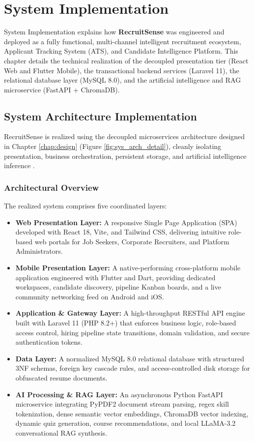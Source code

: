 \chapter{System Implementation} \label{chap:sysImplementation}

System Implementation explains how \textbf{RecruitSense} was engineered and deployed as a fully functional, multi-channel intelligent recruitment ecosystem, Applicant Tracking System (ATS), and Candidate Intelligence Platform. This chapter details the technical realization of the decoupled presentation tier (React Web and Flutter Mobile), the transactional backend services (Laravel 11), the relational database layer (MySQL 8.0), and the artificial intelligence and RAG microservice (FastAPI + ChromaDB).

\section{System Architecture Implementation}
RecruitSense is realized using the decoupled microservices architecture designed in Chapter \ref{chap:design} (Figure \ref{fig:sys_arch_detail}), cleanly isolating presentation, business orchestration, persistent storage, and artificial intelligence inference \cite{fielding2000rest, lewis2020rag, flutter2022google}.

\subsection{Architectural Overview}
The realized system comprises five coordinated layers:
\begin{itemize}
    \item \textbf{Web Presentation Layer:} A responsive Single Page Application (SPA) developed with React 18, Vite, and Tailwind CSS, delivering intuitive role-based web portals for Job Seekers, Corporate Recruiters, and Platform Administrators.
    \item \textbf{Mobile Presentation Layer:} A native-performing cross-platform mobile application engineered with Flutter and Dart, providing dedicated workspaces, candidate discovery, pipeline Kanban boards, and a live community networking feed on Android and iOS.
    \item \textbf{Application \& Gateway Layer:} A high-throughput RESTful API engine built with Laravel 11 (PHP 8.2+) that enforces business logic, role-based access control, hiring pipeline state transitions, domain validation, and secure authentication tokens.
    \item \textbf{Data Layer:} A normalized MySQL 8.0 relational database with structured 3NF schemas, foreign key cascade rules, and access-controlled disk storage for obfuscated resume documents.
    \item \textbf{AI Processing \& RAG Layer:} An asynchronous Python FastAPI microservice integrating PyPDF2 document stream parsing, regex skill tokenization, dense semantic vector embeddings, ChromaDB vector indexing, dynamic quiz generation, course recommendations, and local LLaMA-3.2 conversational RAG synthesis.
\end{itemize}

